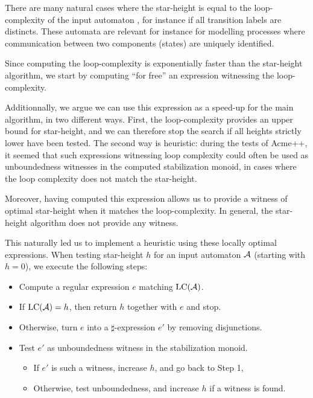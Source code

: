 There are many natural cases where the star-height is equal to the loop-complexity of the input automaton \cite{Cohen70}, for instance if all transition labels are distincts. These automata are relevant for instance for modelling processes where communication between two components (states) are uniquely identified. 

Since computing the loop-complexity is exponentially faster than the star-height algorithm, we start by computing ``for free'' an expression witnessing the loop-complexity.

Additionnally, we argue we can use this expression as a speed-up for the main algorithm, in two different ways.
First, the loop-complexity provides an upper bound for star-height, and we can therefore stop the search if all heights strictly lower have been tested.
The second way is heuristic: during the tests of Acme++, it seemed that such expressions witnessing loop complexity could often be used as unboundedness witnesses in the computed stabilization monoid, in cases where the loop complexity does not match the star-height.

Moreover, having computed this expression allows us to provide a witness of optimal star-height when it matches the loop-complexity. In general, the star-height algorithm does not provide any witness.

This naturally led us to implement a heuristic using these locally optimal expressions.
When testing star-height $h$ for an input automaton $\mathcal{A}$ (starting with $h=0$), we execute the following steps:

\begin{itemize}
\item Compute a regular expression $e$ matching $\mathrm{LC}(\mathcal{A})$.
\item If $\mathrm{LC}(\mathcal{A})=h$, then return $h$ together with $e$ and stop.
\item Otherwise, turn $e$ into a $\sharp$-expression $e'$ by removing disjunctions.
\item Test $e'$ as unboundedness witness in the stabilization monoid.
	\begin{itemize} 
	\item If $e'$ is such a witness, increase $h$, and go back to Step 1,
	\item Otherwise, test unboundedness, and increase $h$ if a witness is found. 
	\end{itemize}
\end{itemize}



